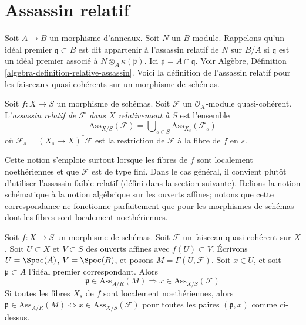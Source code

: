 \section{Assassin relatif}
\label{section-relative-assassin}

\noindent
Soit  $A \to B$  un morphisme d'anneaux. Soit  $N$  un
 $B$-module. Rappelons qu'un idéal premier  $\mathfrak q \subset B$  est dit appartenir
à l'assassin relatif de  $N$  sur  $B/A$  si  $\mathfrak q$  est un idéal
premier associé à  $N \otimes_A \kappa(\mathfrak p)$. Ici  $\mathfrak p = A \cap \mathfrak q$. Voir Algèbre, Définition
 \ref{algebra-definition-relative-assassin}. Voici la définition de l'assassin relatif pour les faisceaux
quasi-cohérents sur un morphisme de schémas.

\begin{definition}
\label{definition-relative-assassin}
Soit $f : X \to S$ un morphisme de schémas. Soit $\mathcal{F}$ un
$\mathcal{O}_X$-module quasi-cohérent. L'{\it assassin relatif
de $\mathcal{F}$ dans $X$ relativement à $S$} est l'ensemble
$$
\text{Ass}_{X/S}(\mathcal{F}) =
\bigcup\nolimits_{s \in S} \text{Ass}_{X_s}(\mathcal{F}_s)
$$
où  $\mathcal{F}_s = (X_s \to X)^*\mathcal{F}$  est la restriction de  $\mathcal{F}$  à la fibre de  $f$  en
 $s$.
\end{definition}

\noindent
Cette notion s'emploie surtout lorsque les fibres de  $f$  sont localement
noethériennes et que  $\mathcal{F}$  est de type fini. Dans le cas général, il
convient plutôt d'utiliser l'assassin faible relatif (défini dans la section
suivante). Relions la notion schématique à la notion algébrique sur les ouverts
affines; notons que cette correspondance
ne fonctionne parfaitement que pour les morphismes de schémas dont les fibres
sont localement noethériennes.

\begin{lemma}
\label{lemma-relative-assassin-affine-open}
Soit  $f : X \to S$  un morphisme de schémas. Soit  $\mathcal{F}$  un faisceau
quasi-cohérent sur  $X$. Soit  $U \subset X$  et  $V \subset S$  des ouverts
affines avec  $f(U) \subset V$. Écrivons  $U = \Spec(A)$,  $V = \Spec(R)$, et posons
 $M = \Gamma(U, \mathcal{F})$. Soit  $x \in U$, et soit  $\mathfrak p \subset A$  l'idéal premier
correspondant. Alors
$$
\mathfrak p \in \text{Ass}_{A/R}(M) \Rightarrow
x \in \text{Ass}_{X/S}(\mathcal{F})
$$
Si toutes les fibres  $X_s$  de  $f$  sont localement noethériennes,
alors  $\mathfrak p \in \text{Ass}_{A/R}(M) \Leftrightarrow
x \in \text{Ass}_{X/S}(\mathcal{F})$  pour toutes les paires  $(\mathfrak p, x)$  comme ci-dessus.
\end{lemma}

